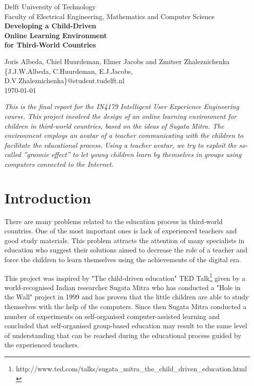 \documentclass[a4paper]{article}
\begin{document}
\begin{titlepage}

\begin{center}

Delft University of Technology\\
Faculty of Electrical Engineering, Mathematics and Computer Science\\[3cm]
\huge \bf{Developing a Child-Driven \\ Online Learning Environment \\ for Third-World Countries}\\[15cm]
\end{center}

\large \noindent 
Joris Albeda, Chiel Huurdeman, Elmer Jacobs and Zmitser Zhaleznichenka\\
\{J.J.W.Albeda, C.Huurdeman, E.J.Jacobs, D.V.Zhaleznichenka\}@student.tudelft.nl\\

\noindent\today

\end{titlepage}

\setcounter{secnumdepth}{3}

\abstract \emph{This is the final report for the IN4179 Intelligent User Experience Engineering course. This project involved the design of an online learning environment for children in third-world countries, based on the ideas of Sugata Mitra. The environment employs an avatar of a teacher communicating with the children to facilitate the educational process. Using a teacher avatar, we try to exploit the so-called ”grannie effect” to let young
children learn by themselves in groups using computers connected to the Internet.}

\section{Introduction}

There are many problems related to the education process in third-world countries. One of the most important ones is lack of experienced teachers and good study materials. This problem attracts the attention of many specialists in education who suggest their solutions aimed to decrease the role of a teacher and force the children to learn themselves using the achievements of the digital era.

This project was inspired by "The child-driven education" TED Talk\footnote{http://www.ted.com/talks/sugata\_mitra\_the\_child\_driven\_education.html} given by a world-recognised Indian researcher Sugata Mitra who has conducted a "Hole in the Wall" project in 1999 and has proven that the little children are able to study themselves with the help of the computers. Since then Sugata Mitra conducted a number of experiments on self-organised computer-assisted learning and concluded that self-organised group-based education may result to the same level of understanding that can be reached during the educational process guided by the experienced teachers. 
\end{document}

